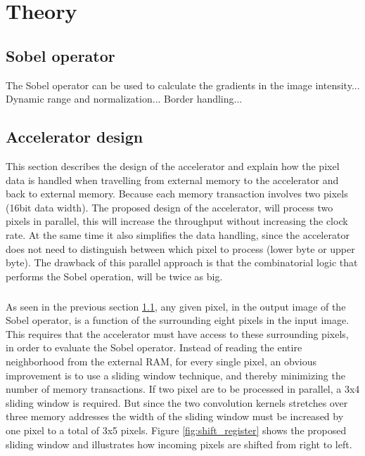 \chapter{Theory}

\section{Sobel operator}
\label{Sobel}
The Sobel operator can be used to calculate the gradients in the image intensity...
Dynamic range and normalization...
Border handling...

\section{Accelerator design} 
This section describes the design of the accelerator and explain how the pixel data is handled when travelling from external memory to the accelerator and back to external memory. 
Because each memory transaction involves two pixels (16bit data width). The proposed design of the accelerator, will process two pixels in parallel, this will increase the throughput without increasing the clock rate. At the same time it also simplifies the data handling, since the accelerator does not need to distinguish between which pixel to process (lower byte or upper byte). The drawback of this parallel approach is that the combinatorial logic that performs the Sobel operation, will be twice as big.

\paragraph*{}
As seen in the previous section \ref{Sobel}, any given pixel, in the output image of the Sobel operator, is a function of the surrounding eight pixels in the input image. This requires that the accelerator must have access to these surrounding pixels, in order to evaluate the Sobel operator. Instead of reading the entire neighborhood from the external RAM, for every single pixel, an obvious improvement is to use a sliding window technique, and thereby minimizing the number of memory transactions. If two pixel are to be processed in parallel, a 3x4 sliding window is required. But since the two convolution kernels stretches over three memory addresses the width of the sliding window must be increased by one pixel to a total of 3x5 pixels.
Figure \ref{fig:shift_register} shows the proposed sliding window and illustrates how incoming pixels are shifted from right to left.

